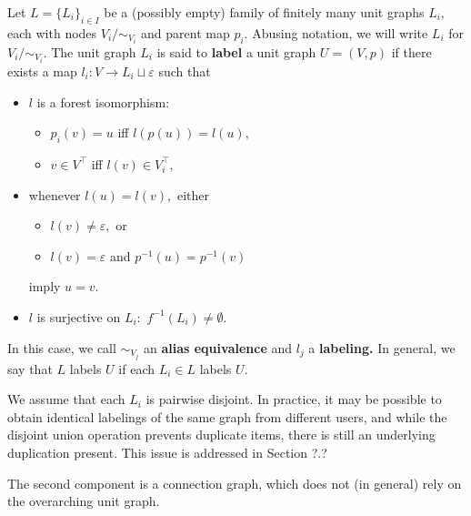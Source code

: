 \begin{itemize}
\begin{definition}
  Let $L = \{L_{i}\}_{i \in I}$ be a (possibly empty) family of finitely many unit graphs $L_{i},$ each with nodes $V_{i} / \sim_{V_{i}}$ and parent map $p_{i}.$ Abusing notation, we will write $L_{i}$ for $V_{i} / \sim_{V_{i}}.$ The unit graph $L_{i}$ is said to \textbf{label} a unit graph $U = (V, p)$
  if there exists a map $l_{i}: V \to L_{i} \sqcup \varepsilon$ such that %
  \begin{itemize}
    \item $l$ is a forest isomorphism:
    \begin{itemize}
      \item $p_{i}(v) = u$ iff $l(p(u)) = l(u),$
      \item $v \in V^{\top}$ iff $l(v) \in V^{\top}_{i},$
    \end{itemize}
    \item whenever $l(u) = l(v),$ either
  \begin{itemize}
    \item $l(v) \neq \varepsilon,$ or
    \item $l(v) = \varepsilon$ and $p^{-1}(u) = p^{-1}(v)$
  \end{itemize}
    imply $u = v.$
    \item $l$ is surjective on $L_{i}:$ $f^{-1}(L_{i}) \neq \emptyset.$
  \end{itemize}
  In this case, we call $\sim_{V_{j}}$ an \textbf{alias equivalence} and $l_{j}$ a \textbf{labeling.} In general, we say that $L$ labels $U$ if each $L_{i} \in L$ labels $U$.

\end{definition}

We assume that each $L_{i}$ is pairwise disjoint. In practice, it may be possible to obtain identical labelings of the same graph from different users, and while the disjoint union operation prevents duplicate items, there is still an underlying duplication present. This issue is addressed in Section ?.?

The second component is a connection graph, which does not (in general) rely on the overarching unit graph.


\end{itemize}
